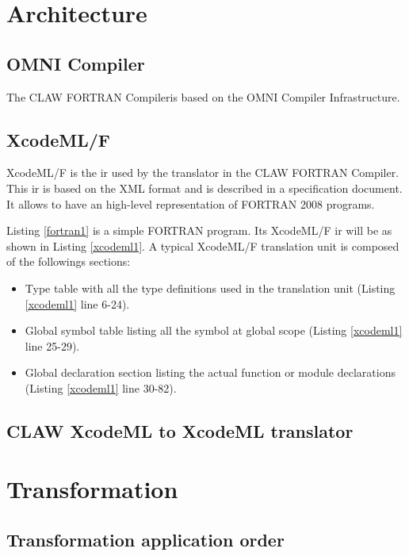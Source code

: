 \documentclass[a4paper, 11pt]{report}
\def\clawfc{CLAW FORTRAN Compiler}
\def\omni{OMNI Compiler Infrastructure}
\newcommand{\emptypage}{}
\begin{document}
\emptypage
\pagebreak
\tableofcontents



\chapter{Architecture}
\section{OMNI Compiler}
The \clawfc is based on the \omni. 

\section{XcodeML/F}
XcodeML/F is the \gls{ir} used by the translator in the CLAW FORTRAN Compiler. This \gls{ir} is based on the XML format and is described in a specification document. It allows to have an high-level representation of FORTRAN 2008 programs.

Listing \ref{fortran1} is a simple FORTRAN program. Its XcodeML/F \gls{ir} will be as shown in Listing \ref{xcodeml1}. A typical XcodeML/F translation unit is composed of the followings sections: 
\begin{itemize}
\item Type table with all the type definitions used in the translation unit (Listing \ref{xcodeml1} line 6-24).
\item Global symbol table listing all the symbol at global scope (Listing \ref{xcodeml1} line 25-29).
\item Global declaration section listing the actual function or module declarations (Listing \ref{xcodeml1} line 30-82).
\end{itemize}





\section{CLAW XcodeML to XcodeML translator}


\chapter{Transformation}
\section{Transformation application order}
\end{document}
